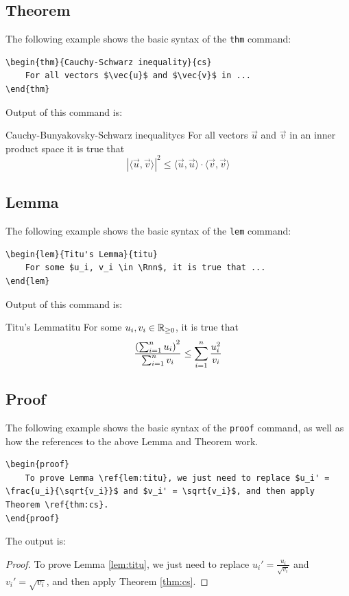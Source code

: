 \documentclass[letterpaper,11pt]{notes}
\theoremstyle{definition}
\theoremstyle{plain}
\theoremstyle{remark}
\begin{document}
\subsection{Theorem}
The following example shows the basic syntax of the \texttt{thm} command:
\begin{verbatim}
\begin{thm}{Cauchy-Schwarz inequality}{cs}
    For all vectors $\vec{u}$ and $\vec{v}$ in ...
\end{thm}
\end{verbatim}
Output of this command is:

\begin{thm}{Cauchy-Bunyakovsky-Schwarz inequality}{cs}
For all vectors $\vec{u}$ and $\vec{v}$ in an inner product space it is true that
\begin{equation}
    \left|\langle\vec{u}, \vec{v}\rangle\right|^2 \leq \langle\vec{u}, \vec{u} \rangle \cdot \langle\vec{v}, \vec{v} \rangle 
\end{equation}
\end{thm}

\subsection{Lemma}
The following example shows the basic syntax of the \texttt{lem} command:
\begin{verbatim}
\begin{lem}{Titu's Lemma}{titu}
    For some $u_i, v_i \in \Rnn$, it is true that ...
\end{lem}
\end{verbatim}
Output of this command is:
\begin{lem}{Titu's Lemma}{titu}
For some $u_i, v_i \in \mathbb{R}_{\geq 0}$, it is true that
\begin{equation}
    \frac{\left(\sum_{i=1}^n u_i\right)^2}{\sum_{i=1}^n v_i} \leq \sum_{i=1}^n \frac{u_i^2}{v_i}
\end{equation}
\end{lem}

\subsection{Proof}
The following example shows the basic syntax of the \texttt{proof} command, as well as how the references to the above Lemma and Theorem work.
\begin{verbatim}
\begin{proof}
    To prove Lemma \ref{lem:titu}, we just need to replace $u_i' = \frac{u_i}{\sqrt{v_i}}$ and $v_i' = \sqrt{v_i}$, and then apply Theorem \ref{thm:cs}. 
\end{proof}
\end{verbatim}
The output is:
\begin{proof}
To prove Lemma \ref{lem:titu}, we just need to replace $u_i' = \frac{u_i}{\sqrt{v_i}}$ and $v_i' = \sqrt{v_i}$, and then apply Theorem \ref{thm:cs}. 
\end{proof}
\end{document}

